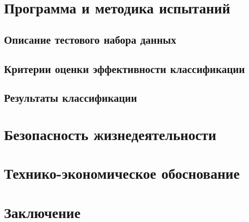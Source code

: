 \clearpage
\section{Программа и методика испытаний}

\newpage 
\subsection{Описание тестового набора данных}\label{test_data}

\clearpage
\subsection{Критерии оценки эффективности классификации}\label{eval}

\newpage
\subsection{Результаты классификации}



\newpage
\section{Безопасность жизнедеятельности}


\newpage
\section{Технико-экономическое обоснование}




% 
% 
% 
% 
% 
 
\newpage
\section*{Заключение}

 
